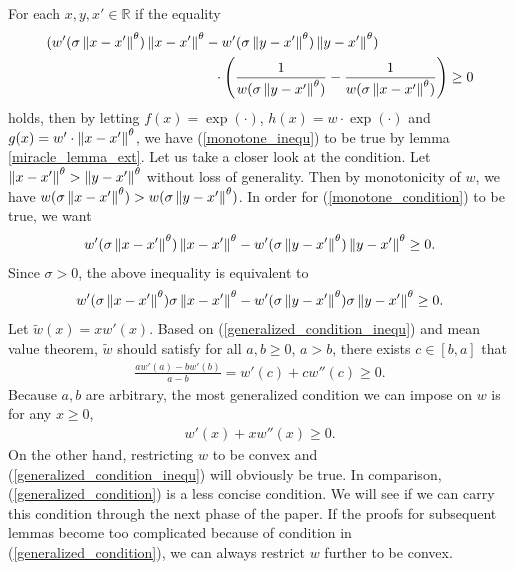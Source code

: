 \documentclass[10pt]{article}
\begin{document}
For each $x,y,x' \in \mathbb{R}$ if the equality
\begin{align} \label{monotone_condition}
     & (w'(\sigma\left\lVert x-x'\right\rVert^{\theta})\left\lVert x-x'\right\rVert^{\theta}-w'(\sigma\left\lVert y-x'\right\rVert^{\theta})\left\lVert y-x'\right\rVert^{\theta}) \nonumber                                   \\
     & \qquad \qquad \qquad \qquad \qquad \qquad \cdot \left(\frac{1}{w(\sigma\left\lVert y-x'\right\rVert^{\theta})}-\frac{1}{w(\sigma\left\lVert x-x'\right\rVert^{\theta})}\right) \geq 0
\end{align}
holds, then by letting $f(x) = \exp(\cdot)$, $h(x) = w \cdot \exp(\cdot)$ and $g(x) = w'\cdot \left\lVert x-x'\right\rVert^{\theta}$, we have (\ref{monotone_inequ}) to be true by lemma \ref{miracle_lemma_ext}. Let us take a closer look at the condition. Let $\left\lVert x-x'\right\rVert^{\theta} > \left\lVert y-x'\right\rVert^{\theta}$ without loss of generality. Then by monotonicity of $w$, we have $w(\sigma\left\lVert x-x'\right\rVert^{\theta})>w(\sigma\left\lVert y-x'\right\rVert^{\theta})$. In order for (\ref{monotone_condition}) to be true, we want
\begin{align}
    w'(\sigma\left\lVert x-x'\right\rVert^{\theta})\left\lVert x-x'\right\rVert^{\theta}-w'(\sigma\left\lVert y-x'\right\rVert^{\theta})\left\lVert y-x'\right\rVert^{\theta} \geq 0.
\end{align}
Since $\sigma >0$, the above inequality is equivalent to
\begin{align} \label{generalized_condition_inequ}
    w'(\sigma\left\lVert x-x'\right\rVert^{\theta})\sigma \left\lVert x-x'\right\rVert^{\theta}-w'(\sigma\left\lVert y-x'\right\rVert^{\theta}) \sigma \left\lVert y-x'\right\rVert^{\theta} \geq 0.
\end{align}
Let $\tilde{w}(x) = x w'(x)$. Based on (\ref{generalized_condition_inequ}) and mean value theorem, $\tilde{w}$ should satisfy for all $a,b\geq 0$, $a>b$, there exists $c \in [b,a]$ that
\begin{align}
    \frac{aw'(a) - bw'(b)}{a-b} = w'(c) + cw''(c) \geq 0.
\end{align}
Because $a,b$ are arbitrary, the most generalized condition we can impose on $w$ is for any $x \geq 0$,
\begin{align} \label{generalized_condition}
    w'(x)+xw''(x) \geq 0.
\end{align}
On the other hand, restricting $w$ to be convex and (\ref{generalized_condition_inequ}) will obviously be true. In comparison, (\ref{generalized_condition}) is a less concise condition. We will see if we can carry this condition through the next phase of the paper. If the proofs for subsequent lemmas become too complicated because of condition in (\ref{generalized_condition}), we can always restrict $w$ further to be convex.
\end{document}
